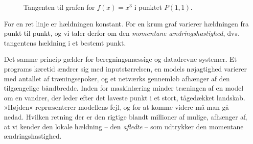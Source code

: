\begin{figure}[htbp]
    \centering
    \caption{Tangenten til grafen for \(f(x)=x^3\) i punktet \(P(1, 1)\).}
    \label{fig:ch10-tangent}
\end{figure}

\begin{remark}
For en ret linje er hældningen konstant. For en krum graf varierer hældningen fra punkt til punkt, og vi taler derfor om den \emph{momentane ændringshastighed}, dvs. tangentens hældning i et bestemt punkt.
\end{remark}

Det samme princip gælder for beregningsmæssige og datadrevne systemer. Et programs køretid ændrer sig med inputstørrelsen, en models nøjagtighed varierer med antallet af træningsepoker, og et netværks gennemløb afhænger af den tilgængelige båndbredde. Inden for maskinlæring minder træningen af en model om en vandrer, der leder efter det laveste punkt i et stort, tågedækket landskab. »Højden« repræsenterer modellens fejl, og for at komme videre må man gå nedad. Hvilken retning der er den rigtige blandt millioner af mulige, afhænger af, at vi kender den lokale hældning -- den \emph{afledte} -- som udtrykker den momentane ændringshastighed.

